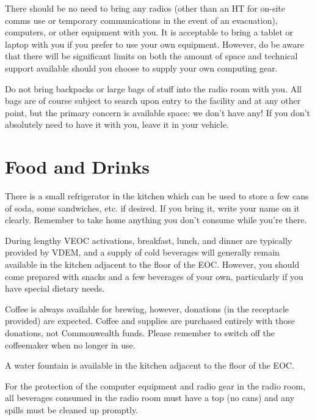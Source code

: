 \documentclass[pdflatex,letterpaper,twoside,12pt]{book}
\begin{document}
There should be no need to bring any radios (other than an HT for on-site comms use or temporary communications in the event of an evacuation), computers, or other equipment with you.  It is acceptable to bring a tablet or laptop with you if you prefer to use your own equipment.  However, do be aware that there will be significant limits on both the amount of space and technical support available should you choose to supply your own computing gear.

Do not bring backpacks or large bags of stuff into the radio room with you.  All bags are of course subject to search upon entry to the facility and at any other point, but the primary concern is available space: we don't have any!  If you don't absolutely need to have it with you, leave it in your vehicle.


\section{Food and Drinks}

There is a small refrigerator in the kitchen which can be used to store a few cans of soda, some sandwiches, etc. if desired.  If you bring it, write your name on it clearly.  Remember to take home anything you don't consume while you're there.

During lengthy VEOC activations, breakfast, lunch, and dinner are typically provided by VDEM, and a supply of cold beverages will generally remain available in the kitchen adjacent to the floor of the EOC.  However, you should come prepared with snacks and a few beverages of your own, particularly if you have special dietary needs.

Coffee is always available for brewing, however, donations (in the receptacle provided) are expected.  Coffee and supplies are purchased entirely with those donations, not Commonwealth funds.  Please remember to switch off the coffeemaker when no longer in use.

A water fountain is available in the kitchen adjacent to the floor of the EOC.

For the protection of the computer equipment and radio gear in the radio room, all beverages consumed in the radio room must have a top (no cans) and any spills must be cleaned up promptly.

\end{document}
